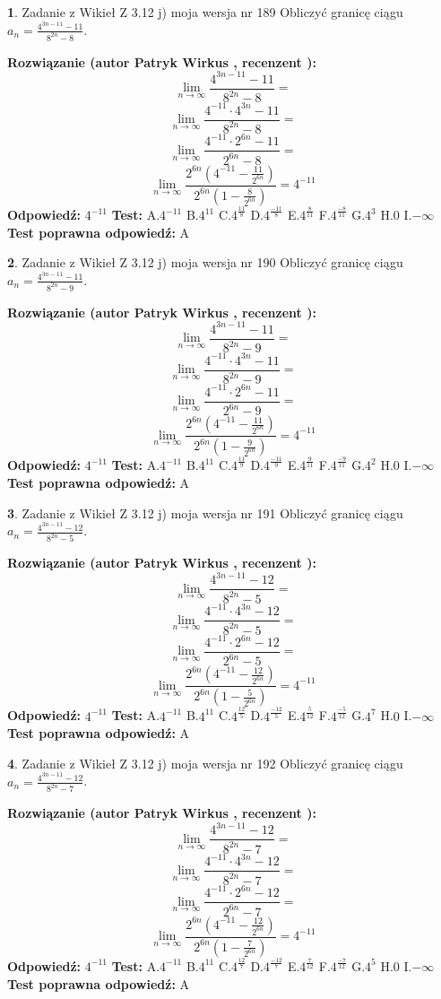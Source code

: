 \documentclass[12pt, a4paper]{article}
\theoremstyle{definition} %
\newtheorem{zad}{}
\newcommand{\zadStart}[1]{\begin{zad}#1\newline}
\newcommand{\zadStop}{\end{zad}}
\newcommand{\rozwStart}[2]{\noindent \textbf{Rozwiązanie (autor #1 , recenzent #2): }\newline}
\newcommand{\rozwStop}{\newline}
\newcommand{\odpStart}{\noindent \textbf{Odpowiedź:}\newline}
\newcommand{\odpStop}{\newline}
\newcommand{\testStart}{\noindent \textbf{Test:}\newline}
\newcommand{\testStop}{\newline}
\newcommand{\kluczStart}{\noindent \textbf{Test poprawna odpowiedź:}\newline}
\newcommand{\kluczStop}{\newline}
\begin{document}
\zadStart{Zadanie z Wikieł Z 3.12 j) moja wersja nr 189}
Obliczyć granicę ciągu $a_{n}=\frac{4^{3n-11}-11}{8^{2n}-8}$.
\zadStop
\rozwStart{Patryk Wirkus}{}
$$\lim\limits_{n\to\infty}\frac{4^{3n-11}-11}{8^{2n}-8}=$$
$$\lim\limits_{n\to\infty}\frac{4^{-11} \cdot 4^{3n}-11}{8^{2n}-8}=$$
$$\lim\limits_{n\to\infty}\frac{4^{-11} \cdot 2^{6n}-11}{2^{6n}-8}=$$
$$\lim\limits_{n\to\infty}\frac{2^{6n}(4^{-11} - \frac{11}{2^{6n}})}{2^{6n}(1-\frac{8}{2^{6n}})}= 4^{-11}$$
\rozwStop
\odpStart
$4^{-11}$
\odpStop
\testStart
A.$4^{-11}$
B.$4^{11}$
C.$4^{\frac{11}{8}}$
D.$4^{\frac{-11}{8}}$
E.$4^{\frac{8}{11}}$
F.$4^{\frac{-8}{11}}$
G.$4^{3}$
H.$0$
I.$-\infty$
\testStop
\kluczStart
A
\kluczStop



\zadStart{Zadanie z Wikieł Z 3.12 j) moja wersja nr 190}
Obliczyć granicę ciągu $a_{n}=\frac{4^{3n-11}-11}{8^{2n}-9}$.
\zadStop
\rozwStart{Patryk Wirkus}{}
$$\lim\limits_{n\to\infty}\frac{4^{3n-11}-11}{8^{2n}-9}=$$
$$\lim\limits_{n\to\infty}\frac{4^{-11} \cdot 4^{3n}-11}{8^{2n}-9}=$$
$$\lim\limits_{n\to\infty}\frac{4^{-11} \cdot 2^{6n}-11}{2^{6n}-9}=$$
$$\lim\limits_{n\to\infty}\frac{2^{6n}(4^{-11} - \frac{11}{2^{6n}})}{2^{6n}(1-\frac{9}{2^{6n}})}= 4^{-11}$$
\rozwStop
\odpStart
$4^{-11}$
\odpStop
\testStart
A.$4^{-11}$
B.$4^{11}$
C.$4^{\frac{11}{9}}$
D.$4^{\frac{-11}{9}}$
E.$4^{\frac{9}{11}}$
F.$4^{\frac{-9}{11}}$
G.$4^{2}$
H.$0$
I.$-\infty$
\testStop
\kluczStart
A
\kluczStop



\zadStart{Zadanie z Wikieł Z 3.12 j) moja wersja nr 191}
Obliczyć granicę ciągu $a_{n}=\frac{4^{3n-11}-12}{8^{2n}-5}$.
\zadStop
\rozwStart{Patryk Wirkus}{}
$$\lim\limits_{n\to\infty}\frac{4^{3n-11}-12}{8^{2n}-5}=$$
$$\lim\limits_{n\to\infty}\frac{4^{-11} \cdot 4^{3n}-12}{8^{2n}-5}=$$
$$\lim\limits_{n\to\infty}\frac{4^{-11} \cdot 2^{6n}-12}{2^{6n}-5}=$$
$$\lim\limits_{n\to\infty}\frac{2^{6n}(4^{-11} - \frac{12}{2^{6n}})}{2^{6n}(1-\frac{5}{2^{6n}})}= 4^{-11}$$
\rozwStop
\odpStart
$4^{-11}$
\odpStop
\testStart
A.$4^{-11}$
B.$4^{11}$
C.$4^{\frac{12}{5}}$
D.$4^{\frac{-12}{5}}$
E.$4^{\frac{5}{12}}$
F.$4^{\frac{-5}{12}}$
G.$4^{7}$
H.$0$
I.$-\infty$
\testStop
\kluczStart
A
\kluczStop



\zadStart{Zadanie z Wikieł Z 3.12 j) moja wersja nr 192}
Obliczyć granicę ciągu $a_{n}=\frac{4^{3n-11}-12}{8^{2n}-7}$.
\zadStop
\rozwStart{Patryk Wirkus}{}
$$\lim\limits_{n\to\infty}\frac{4^{3n-11}-12}{8^{2n}-7}=$$
$$\lim\limits_{n\to\infty}\frac{4^{-11} \cdot 4^{3n}-12}{8^{2n}-7}=$$
$$\lim\limits_{n\to\infty}\frac{4^{-11} \cdot 2^{6n}-12}{2^{6n}-7}=$$
$$\lim\limits_{n\to\infty}\frac{2^{6n}(4^{-11} - \frac{12}{2^{6n}})}{2^{6n}(1-\frac{7}{2^{6n}})}= 4^{-11}$$
\rozwStop
\odpStart
$4^{-11}$
\odpStop
\testStart
A.$4^{-11}$
B.$4^{11}$
C.$4^{\frac{12}{7}}$
D.$4^{\frac{-12}{7}}$
E.$4^{\frac{7}{12}}$
F.$4^{\frac{-7}{12}}$
G.$4^{5}$
H.$0$
I.$-\infty$
\testStop
\kluczStart
A
\kluczStop
\end{document}
